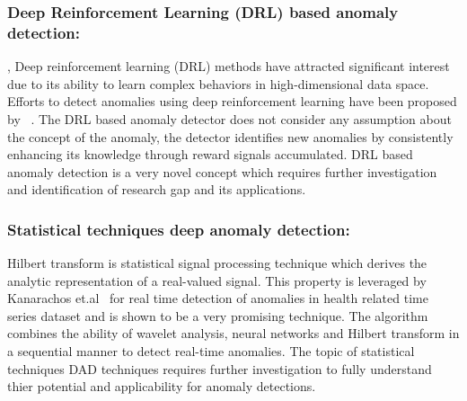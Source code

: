 \subsubsection{Deep Reinforcement Learning (DRL) based anomaly detection:}
\label{reinforcementlearning},
Deep reinforcement learning (DRL) methods have attracted significant interest due to its ability to learn complex behaviors in high-dimensional data space. Efforts to detect anomalies using deep reinforcement learning have been proposed by ~\cite{de2017learning,rlanomaly}.
The DRL based anomaly detector  does not consider any assumption about the concept of the anomaly,  the detector identifies new anomalies by consistently enhancing its knowledge  through reward signals accumulated. DRL based anomaly detection is a very novel concept which  requires further investigation and identification of research gap and its applications.

\subsubsection{Statistical techniques deep anomaly detection: }
Hilbert transform is statistical signal processing technique which derives the analytic representation of a real-valued signal. This property is leveraged by Kanarachos et.al~\cite{kanarachos2015anomaly} for real time detection of anomalies in health related time series dataset and is shown to be a very promising technique. The algorithm combines the ability of wavelet analysis, neural networks and Hilbert transform in a sequential manner to detect real-time anomalies. The topic of statistical techniques DAD techniques requires further investigation to fully understand thier potential and applicability for anomaly detections.



